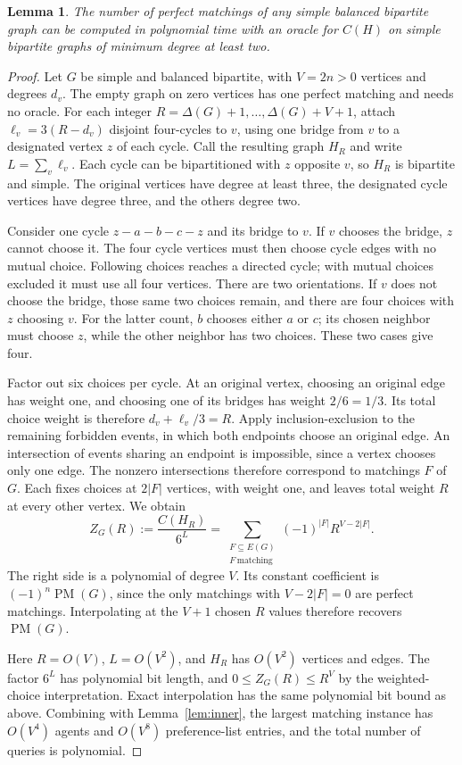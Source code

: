 \documentclass[11pt]{article}
\newtheorem{lemma}{Lemma}
\newcommand{\PM}{\operatorname{PM}}
\begin{document}
\begin{lemma}\label{lem:outer}
The number of perfect matchings of any simple balanced bipartite graph can be
computed in polynomial time with an oracle for $C(H)$ on simple bipartite
graphs of minimum degree at least two.
\end{lemma}
\begin{proof}
Let $G$ be simple and balanced bipartite, with $V=2n>0$ vertices and
degrees $d_v$. The empty graph on
zero vertices has one perfect matching and needs no oracle.
For each integer
$R=\Delta(G)+1,\ldots,\Delta(G)+V+1$, attach
$\ell_v=3(R-d_v)$ disjoint four-cycles to $v$, using one bridge from
$v$ to a designated vertex $z$ of each cycle. Call the resulting graph
$H_R$ and write $L=\sum_v\ell_v$.
Each cycle can be bipartitioned with $z$ opposite $v$, so $H_R$ is
bipartite and simple. The original vertices have degree at least three,
the designated cycle vertices have degree three, and the others degree
two.

Consider one cycle $z-a-b-c-z$ and its bridge to $v$.
If $v$ chooses the bridge, $z$ cannot choose it.
The four cycle vertices must then choose cycle edges with no mutual
choice. Following choices reaches a directed cycle; with mutual choices
excluded it must use all four vertices. There are two orientations.
If $v$ does not choose the bridge, those same two choices remain, and
there are four choices with $z$ choosing $v$.
For the latter count, $b$ chooses either $a$ or $c$; its chosen neighbor
must choose $z$, while the other neighbor has two choices. These two
cases give four.

Factor out six choices per cycle. At an original vertex, choosing an
original edge has weight one, and choosing one of its bridges has
weight $2/6=1/3$. Its total choice weight is therefore
$d_v+\ell_v/3=R$.
Apply inclusion-exclusion to the remaining forbidden events, in which
both endpoints choose an original edge. An intersection
of events sharing an endpoint is impossible, since a vertex chooses
only one edge. The nonzero intersections therefore correspond to
matchings $F$ of $G$. Each fixes choices at $2|F|$ vertices,
with weight one, and leaves total weight $R$ at every other vertex.
We obtain
\[
 Z_G(R):=\frac{C(H_R)}{6^L}
       =\sum_{\substack{F\subseteq E(G)\\F\ \mathrm{matching}}}
          (-1)^{|F|}R^{V-2|F|}.                   \tag{6}
\]
The right side is a polynomial of degree $V$.
Its constant coefficient is $(-1)^n\PM(G)$, since the only matchings
with $V-2|F|=0$ are perfect matchings. Interpolating at the $V+1$
chosen $R$ values therefore recovers $\PM(G)$.

Here $R=O(V)$, $L=O(V^2)$, and $H_R$ has $O(V^2)$ vertices and edges.
The factor $6^L$ has polynomial bit length, and $0\leq Z_G(R)\leq R^V$
by the weighted-choice interpretation. Exact interpolation has the same
polynomial bit bound as above. Combining with Lemma~\ref{lem:inner},
the largest matching instance has $O(V^4)$ agents and $O(V^8)$
preference-list entries, and the total number of queries is polynomial.
\end{proof}
\end{document}
